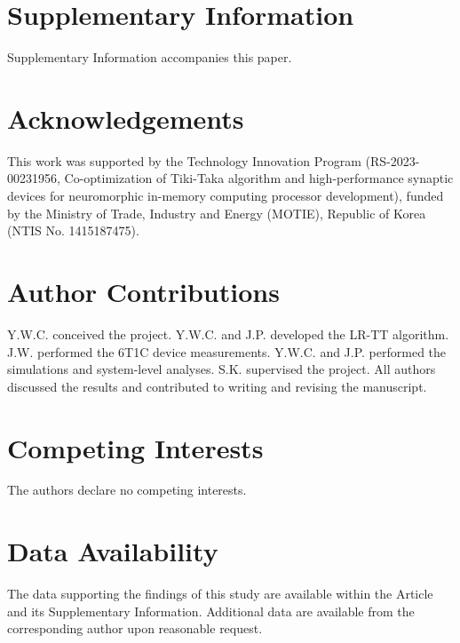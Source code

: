 \documentclass[fleqn,10pt]{wlscirep}
\begin{document}
\section*{Supplementary Information}
Supplementary Information accompanies this paper.

\section*{Acknowledgements}
This work was supported by the Technology Innovation Program
(RS-2023-00231956, Co-optimization of Tiki-Taka algorithm and
high-performance synaptic devices for neuromorphic in-memory
computing processor development), funded by the Ministry of Trade,
Industry and Energy (MOTIE), Republic of Korea
(NTIS No. 1415187475).

\section*{Author Contributions}
Y.W.C. conceived the project. Y.W.C. and J.P. developed the LR-TT
algorithm. J.W. performed the 6T1C device measurements. Y.W.C. and
J.P. performed the simulations and system-level analyses. S.K.
supervised the project. All authors discussed the results and
contributed to writing and revising the manuscript.

\section*{Competing Interests}
The authors declare no competing interests.

\section*{Data Availability}
The data supporting the findings of this study are available within
the Article and its Supplementary Information. Additional data are
available from the corresponding author upon reasonable request.
\end{document}
